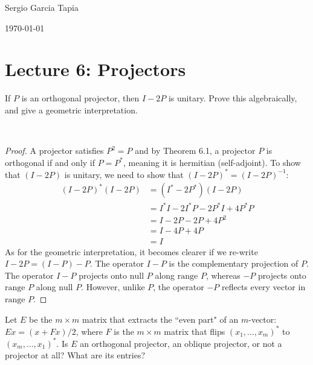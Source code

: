\documentclass[12pt]{article}
\newenvironment{ex}[2][Exercise]{\begin{trivlist}
		\item[\hskip \labelsep {\bfseries #1}\hskip \labelsep {\bfseries #2.}]}{\end{trivlist}}
\newenvironment{sol}[1][Solution]{\begin{trivlist}
		\item[\hskip \labelsep {\bfseries #1:}]}{\end{trivlist}}
\begin{document}

\noindent Sergio Garcia Tapia \hfill

 \hfill 

 \hfill 

\noindent\today
\section*{Lecture 6: Projectors}

\begin{ex}{1}
	If $P$ is an orthogonal projector, then $I-2P$ is unitary. Prove this algebraically, and
	give a geometric interpretation.
\end{ex}

\begin{sol}
	\
	\begin{proof}
		A projector satisfies $P^2=P$ and by Theorem 6.1, a projector $P$ is orthogonal if and only if $P=P^*$,
		meaning it is hermitian (self-adjoint). To show that $(I-2P)$ is unitary, we need to show that
		 $(I-2P)^*=(I-2P)^{-1}$:
		\begin{align*}
			(I-2P)^*(I-2P)&=(I^*-2P^*)(I-2P)\\
			&=I^*I-2I^*P-2P^*I+4P^*P\\
			&=I-2P-2P+4P^2\\
			&=I-4P+4P\\
			&=I
		\end{align*}
		As for the geometric interpretation, it becomes clearer if we re-write $I-2P=(I-P)-P$. The operator
		$I-P$ is the complementary projection of $P$. The operator $I-P$ projects onto $\text{null }P$ along
		$\text{range }P$, whereas $-P$ projects onto $\text{range }P$ along $\text{null }P$. However, unlike
		$P$, the operator $-P$ reflects every vector in $\text{range }P$.
	\end{proof}
\end{sol}

\begin{ex}{2}
	Let $E$ be the $m\times m$ matrix that extracts the ``even part" of an $m$-vector: $Ex=(x+Fx)/2$, where
	$F$ is the $m\times m$ matrix that flips $(x_1,\ldots,x_m)^*$ to $(x_m,\ldots,x_1)^*$. Is $E$ an
	orthogonal projector, an oblique projector, or not a projector at all? What are its entries?
\end{ex}
\end{document}
